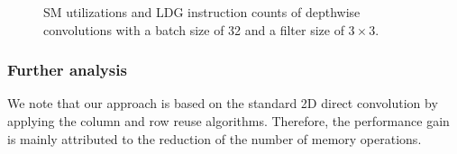 \begin{figure}
    \centering
    \qquad
    \vspace{5mm}
    \vspace{-4mm}
    \caption{SM utilizations and LDG instruction counts of depthwise convolutions with a batch size of 32 and a filter size of $3\times3$.}
    \label{fig:dwratio}
\end{figure}

\subsubsection{Further analysis}
We note that our approach is based on the standard 2D direct convolution by applying the column and row reuse algorithms. 
Therefore, the performance gain is mainly attributed to the reduction of the number of memory operations. 

